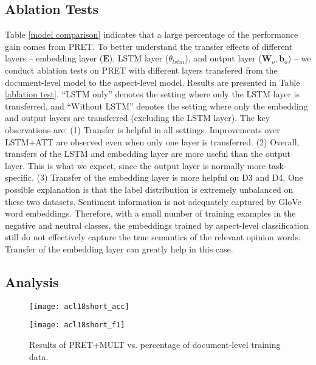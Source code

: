 \documentclass[11pt,a4paper]{article}
\begin{document}
\subsection{Ablation Tests}
Table \ref{model comparison} indicates that a large percentage of the performance gain comes from PRET. To better understand the transfer effects of different layers -- embedding layer ($\mathbf{E}$), LSTM layer ($\theta_{lstm}$), and output layer ($\mathbf{W}_o, \mathbf{b}_o$) -- we conduct ablation tests on PRET with different layers transfered from the document-level model to the aspect-level model. Results are presented in Table \ref{ablation test}. ``LSTM only'' denotes the setting where only the LSTM layer is transferred, and ``Without LSTM'' denotes the setting where only the embedding and output layers are transferred (excluding the LSTM layer). The key observations are: (1) Transfer is helpful in all settings. Improvements over LSTM+ATT are observed even when only one layer is transferred. (2) Overall, transfers of the LSTM and embedding layer are more useful than the output layer. This is what we expect, since the output layer is normally more task-specific. 
(3) Transfer of the embedding layer is more helpful on D3 and D4. One possible explanation is that the label distribution is extremely unbalanced on these two datasets. Sentiment information is not adequately captured by GloVe word embeddings. Therefore, with a small number of training examples in the negative and neutral classes, the embeddings trained by aspect-level classification still do not effectively capture the true semantics of the relevant opinion words. Transfer of the embedding layer can greatly help in this case.

\subsection{Analysis}

\begin{figure}[t]
  \centering
  \begin{minipage}[b]{0.37\textwidth}
    \texttt{[image: acl18short\_acc]}
  \end{minipage}
  \hfill
  \begin{minipage}[b]{0.37\textwidth}
    \texttt{[image: acl18short\_f1]}
  \end{minipage}
  \caption{Results of PRET+MULT vs. percentage of document-level training data.}
    \label{percentage}
\end{figure}
\end{document}
